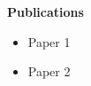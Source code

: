 \vspace{1cm}
\noindent\textbf{\large{Publications}}

\begin{itemize}
	
\item Paper 1

\item Paper 2

\end{itemize}


